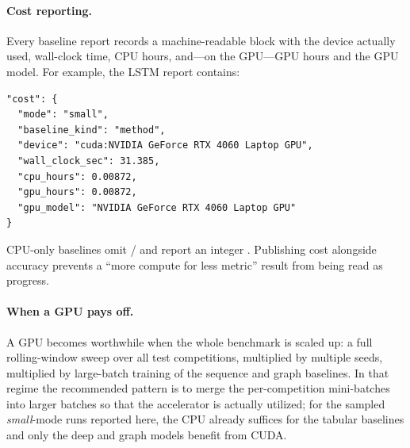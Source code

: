 \paragraph{Cost reporting.}
Every baseline report records a machine-readable  block with the
device actually used, wall-clock time, CPU hours, and---on the GPU---GPU hours
and the GPU model. For example, the  LSTM report contains:
\begin{verbatim}
"cost": {
  "mode": "small",
  "baseline_kind": "method",
  "device": "cuda:NVIDIA GeForce RTX 4060 Laptop GPU",
  "wall_clock_sec": 31.385,
  "cpu_hours": 0.00872,
  "gpu_hours": 0.00872,
  "gpu_model": "NVIDIA GeForce RTX 4060 Laptop GPU"
}
\end{verbatim}
CPU-only baselines omit / and report an integer
. Publishing cost alongside accuracy prevents a
``more compute for less metric'' result from being read as progress.

\paragraph{When a GPU pays off.}
A GPU becomes worthwhile when the whole benchmark is scaled up: a full
rolling-window sweep over all test competitions, multiplied by multiple seeds,
multiplied by large-batch training of the sequence and graph baselines. In that
regime the recommended pattern is to merge the per-competition mini-batches
into larger batches so that the accelerator is actually utilized; for the
sampled \emph{small}-mode runs reported here, the CPU already suffices for the
tabular baselines and only the deep and graph models benefit from CUDA.
